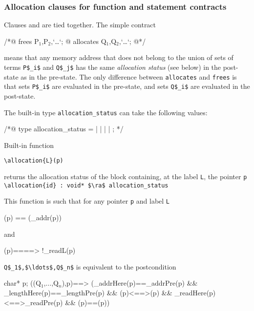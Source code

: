 \subsubsection{Allocation clauses for function 
and statement contracts}

Clauses \allocates and \frees are tied together. The simple contract  
\begin{listing-nonumber}
/*@ frees P$_1$,P$_2$,`\dots`;
  @ allocates Q$_1$,Q$_2$,`\dots`;
  @*/
\end{listing-nonumber}
means that any memory address that does not belong to the union of sets of terms
\lstinline|P$_i$| and \lstinline|Q$_j$| has the same {\sl allocation status} 
(see below) in the post-state as in the pre-state. The only difference
between \lstinline|allocates| and \lstinline|frees| is that sets 
\lstinline|P$_i$| are evaluated 
in the pre-state, and sets \lstinline|Q$_i$| are evaluated in the post-state.

The built-in type \lstinline|allocation_status|
can take the following values:
\begin{notimplementedenv}
\begin{listing-nonumber}
/*@
type allocation_status = 
    \static | \register | \automatic | \dynamic | \unallocated;
*/
\end{listing-nonumber}
\end{notimplementedenv}

Built-in function
\begin{notimplementedenv}\lstinline|\allocation{L}(p)|\end{notimplementedenv}%
returns the allocation status of the block containing, at the label 
\lstinline|L|, the pointer \lstinline|p| 
\\ \makebox[5mm]{} \lstinline|\allocation{id} : void* $\ra$ allocation_status|

This function is such that for any pointer \lstinline|p| and label \lstinline|L|
\begin{listing-nonumber}
(p) == (\base_addr(p))
\end{listing-nonumber}
and
\begin{listing-nonumber}
(p)==\unallocated ==> !\valid_read{L}(p)
\end{listing-nonumber}

\allocates \lstinline|Q$_1$,$\ldots$,Q$_n$| is equivalent to the postcondition
\begin{listing-nonumber}
\forall char* p; 
\separated(\union(Q$_1$,$\ldots$,Q$_n$),p)==>
     (\base_addr{Here}(p)==\base_addr{Pre}(p)
      && \block_length{Here}(p)==\block_length{Pre}(p)
      && (p)<==>(p)
      && \valid_read{Here}(p)<==>\valid_read{Pre}(p)
      && (p)==(p))
\end{listing-nonumber}

